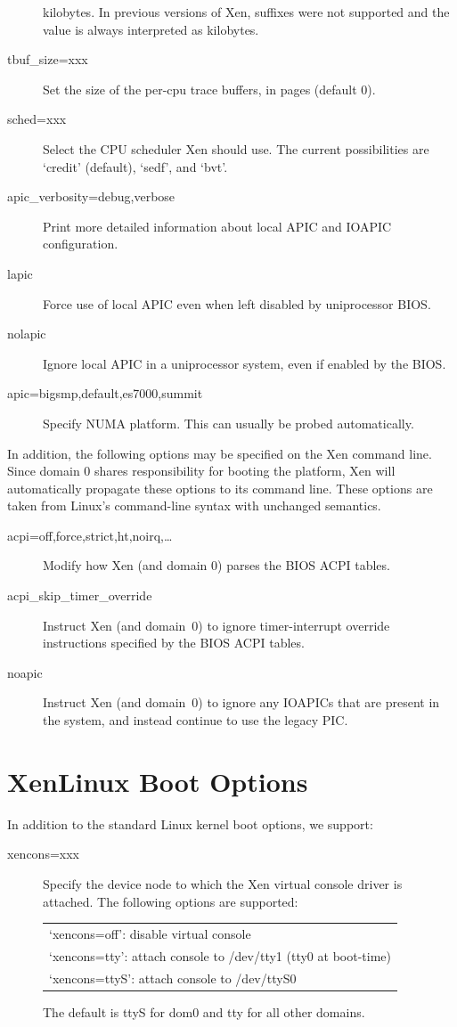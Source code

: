 \documentclass[11pt,twoside,final,openright]{report}
\begin{document}
\begin{description}
  kilobytes. In previous versions of Xen, suffixes were not supported
  and the value is always interpreted as kilobytes.
\item [ tbuf\_size=xxx ] Set the size of the per-cpu trace buffers, in
  pages (default 0).  
\item [ sched=xxx ] Select the CPU scheduler Xen should use.  The
  current possibilities are `credit' (default), `sedf', and `bvt'.
\item [ apic\_verbosity=debug,verbose ] Print more detailed
  information about local APIC and IOAPIC configuration.
\item [ lapic ] Force use of local APIC even when left disabled by
  uniprocessor BIOS.
\item [ nolapic ] Ignore local APIC in a uniprocessor system, even if
  enabled by the BIOS.
\item [ apic=bigsmp,default,es7000,summit ] Specify NUMA platform.
  This can usually be probed automatically.
\end{description}

In addition, the following options may be specified on the Xen command
line. Since domain 0 shares responsibility for booting the platform,
Xen will automatically propagate these options to its command line.
These options are taken from Linux's command-line syntax with
unchanged semantics.

\begin{description}
\item [ acpi=off,force,strict,ht,noirq,\ldots ] Modify how Xen (and
  domain 0) parses the BIOS ACPI tables.
\item [ acpi\_skip\_timer\_override ] Instruct Xen (and domain~0) to
  ignore timer-interrupt override instructions specified by the BIOS
  ACPI tables.
\item [ noapic ] Instruct Xen (and domain~0) to ignore any IOAPICs
  that are present in the system, and instead continue to use the
  legacy PIC.
\end{description} 


\section{XenLinux Boot Options}

In addition to the standard Linux kernel boot options, we support:
\begin{description}
\item[ xencons=xxx ] Specify the device node to which the Xen virtual
  console driver is attached. The following options are supported:
  \begin{center}
    \begin{tabular}{l}
      `xencons=off': disable virtual console \\
      `xencons=tty': attach console to /dev/tty1 (tty0 at boot-time) \\
      `xencons=ttyS': attach console to /dev/ttyS0
    \end{tabular}
\end{center}
The default is ttyS for dom0 and tty for all other domains.
\end{description}
\end{document}
